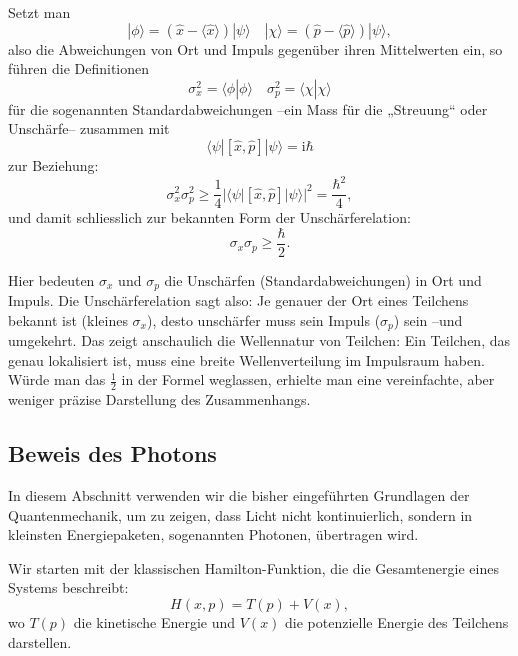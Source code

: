 Setzt man
\begin{equation}
	|\phi\rangle = (\hat{x} - \langle \hat{x} \rangle) |\psi\rangle \quad |\chi\rangle = (\hat{p} - \langle \hat{p} \rangle) | \psi\rangle,
\end{equation}
also die Abweichungen von Ort und Impuls gegenüber ihren Mittelwerten ein, so führen die Definitionen
\begin{equation}
	\sigma_x^2 = \langle\phi | \phi\rangle \quad \sigma_p^2 = \langle\chi | \chi\rangle
\end{equation}
für die sogenannten Standardabweichungen --ein Mass für die „Streuung“ oder Unschärfe-- zusammen mit
\begin{equation}
	\langle\psi | [\hat{x},\hat{p}] | \psi\rangle = \mathrm{i}\hbar
\end{equation}
zur Beziehung:
\begin{equation}
	\sigma_x^2 \sigma_p^2 \ge \frac{1}{4} |\langle\psi | [\hat{x},\hat{p}] | \psi\rangle|^2 = \frac{\hbar^2}{4},
\end{equation}
und damit schliesslich zur bekannten Form der Unschärferelation:
\begin{equation}
	\sigma_x \sigma_p \ge \frac{\hbar}{2}.
\end{equation}

Hier bedeuten $\sigma_x$ und $\sigma_p$ die Unschärfen (Standardabweichungen) in Ort und Impuls.
Die Unschärferelation sagt also:
Je genauer der Ort eines Teilchens bekannt ist (kleines $\sigma_x$), desto unschärfer muss sein Impuls ($\sigma_p$) sein --und umgekehrt.
Das zeigt anschaulich die Wellennatur von Teilchen:
Ein Teilchen, das genau lokalisiert ist, muss eine breite Wellenverteilung im Impulsraum haben.
Würde man das $\tfrac{1}{2}$ in der Formel weglassen, erhielte man eine vereinfachte, aber weniger präzise Darstellung des Zusammenhangs.

\subsection{Beweis des Photons\label{fourier:subsection:beweisPhoton}}
In diesem Abschnitt verwenden wir die bisher eingeführten Grundlagen der Quantenmechanik, um zu zeigen, dass Licht nicht kontinuierlich, sondern in kleinsten Energiepaketen, sogenannten Photonen, übertragen wird.

Wir starten mit der klassischen Hamilton-Funktion, die die Gesamtenergie eines Systems beschreibt:
\begin{equation}
	H(x, p) = T(p) + V(x),
\end{equation}
wo $T(p)$ die kinetische Energie und $V(x)$ die potenzielle Energie des Teilchens darstellen.

